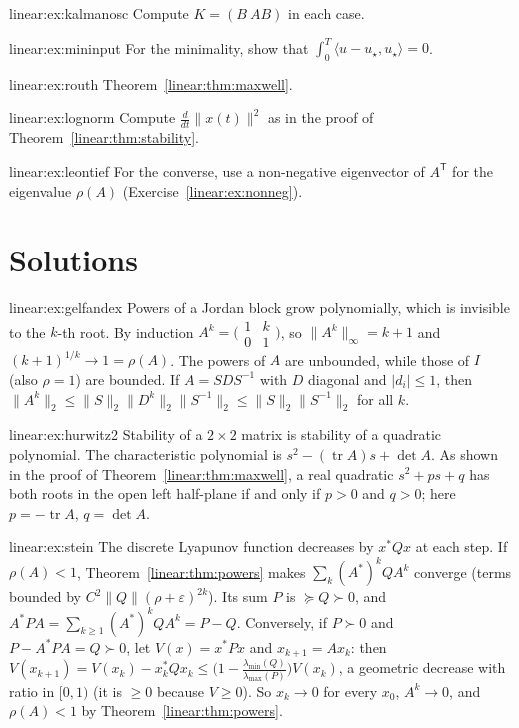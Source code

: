 \begin{hint}{linear:ex:kalmanosc}
Compute $K=(B\ AB)$ in each case.
\end{hint}
\begin{hint}{linear:ex:mininput}
For the minimality, show that $\int_0^T\langle u-u_\star,u_\star\rangle=0$.
\end{hint}
\begin{hint}{linear:ex:routh}
Theorem~\ref{linear:thm:maxwell}.
\end{hint}
\begin{hint}{linear:ex:lognorm}
Compute $\frac d{dt}\|x(t)\|^2$ as in the proof of Theorem~\ref{linear:thm:stability}.
\end{hint}
\begin{hint}{linear:ex:leontief}
For the converse, use a non-negative eigenvector of $A^{\mathsf T}$ for the eigenvalue $\rho(A)$ (Exercise~\ref{linear:ex:nonneg}).
\end{hint}

\section{Solutions}

\begin{solution}{linear:ex:gelfandex}
\idea Powers of a Jordan block grow polynomially, which is invisible to the $k$-th root.
\writeup By induction $A^k=\bigl(\begin{smallmatrix}1&k\\0&1\end{smallmatrix}\bigr)$, so $\|A^k\|_\infty=k+1$ and $(k+1)^{1/k}\to1=\rho(A)$. The
powers of $A$ are unbounded, while those of $I$ (also $\rho=1$) are bounded. If $A=SDS^{-1}$ with $D$ diagonal and $|d_i|\le1$, then
$\|A^k\|_2\le\|S\|_2\|D^k\|_2\|S^{-1}\|_2\le\|S\|_2\|S^{-1}\|_2$ for all $k$.
\end{solution}

\begin{solution}{linear:ex:hurwitz2}
\idea Stability of a $2\times2$ matrix is stability of a quadratic polynomial.
\writeup The characteristic polynomial is $s^2-(\operatorname{tr}A)s+\det A$. As shown in the proof of Theorem~\ref{linear:thm:maxwell}, a real
quadratic $s^2+ps+q$ has both roots in the open left half-plane if and only if $p>0$ and $q>0$; here $p=-\operatorname{tr}A$, $q=\det A$.
\end{solution}

\begin{solution}{linear:ex:stein}
\idea The discrete Lyapunov function decreases by $x^*Qx$ at each step.
\writeup If $\rho(A)<1$, Theorem~\ref{linear:thm:powers} makes $\sum_k(A^*)^kQA^k$ converge (terms bounded by $C^2\|Q\|(\rho+\varepsilon)^{2k}$). Its sum
$P$ is $\succeq Q\succ0$, and $A^*PA=\sum_{k\ge1}(A^*)^kQA^k=P-Q$. Conversely, if $P\succ0$ and $P-A^*PA=Q\succ0$, let $V(x)=x^*Px$ and $x_{k+1}=
Ax_k$: then $V(x_{k+1})=V(x_k)-x_k^*Qx_k\le\bigl(1-\frac{\lambda_{\min}(Q)}{\lambda_{\max}(P)}\bigr)V(x_k)$, a geometric decrease with ratio
in $[0,1)$ (it is $\ge0$ because $V\ge0$). So $x_k\to0$ for every $x_0$, $A^k\to0$, and $\rho(A)<1$ by Theorem~\ref{linear:thm:powers}.
\end{solution}


